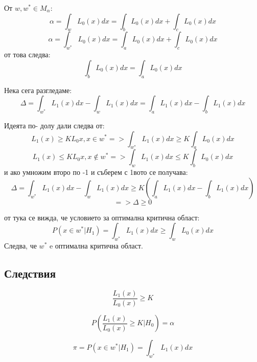 \documentclass{article}
\begin{document}
От $w,w^{*} \in M_{\alpha}:$
$$\alpha = \int_{w} L_{0}(x) dx = \int_{b} L_{0}(x) dx + \int_{c} L_{0}(x) dx$$
$$\alpha = \int_{w^{*}} L_{0}(x) dx = \int_{a} L_{0}(x) dx + \int_{c} L_{0}(x) dx$$
от това следва:
$$\int_{b} L_{0}(x) dx = \int_{a} L_{0}(x) dx$$


Нека сега разгледаме:
$$\Delta = \int_{w^{*}} L_{1}(x) dx - \int_{w} L_{1}(x) dx=\int_{a} L_{1}(x) dx - \int_{b} L_{1}(x) dx$$

Идеята по- долу дали следва от: \\
$$L_{1}(x) \geq K L_{0} x, x \in w^{*} => \int_{w^{*}} L_{1}(x) dx \geq K \int_{a} L_{0}(x)dx $$
$$L_{1}(x) \leq K L_{0} x,x \notin w^{*} => \int_{w} L_{1}(x) dx \leq K \int_{b} L_{0}(x)dx $$
и ако умножим второ по -1 и съберем с 1вото се получава: \\


$$\Delta = \int_{w^{*}} L_{1}(x) dx - \int_{w} L_{1}(x) dx \geq K(\int_{a} L_{1}(x) dx - \int_{b} L_{1}(x) dx )$$
$$=> \Delta \geq 0$$

от тука се вижда, че условието за оптимална критична област:
$$P(x \in w^{*}|H_{1}) = \int_{w^{*}} L_{1}(x) dx \geq \int_{w} L_{0} (x) dx$$
Следва, че $w^{*}$ e оптимална критична област.

\subsection{Следствия}

$$\frac{L_{1}(x)}{L_{0}(x)} \geq K$$


$$P(\frac{L_{1}(x)}{L_{0}(x)} \geq K| H_{0})=\alpha $$


$$\pi=P(x \in w^{*} | H_{1}) = \int_{w^{*}} L_{1}(x) dx$$
\end{document}
